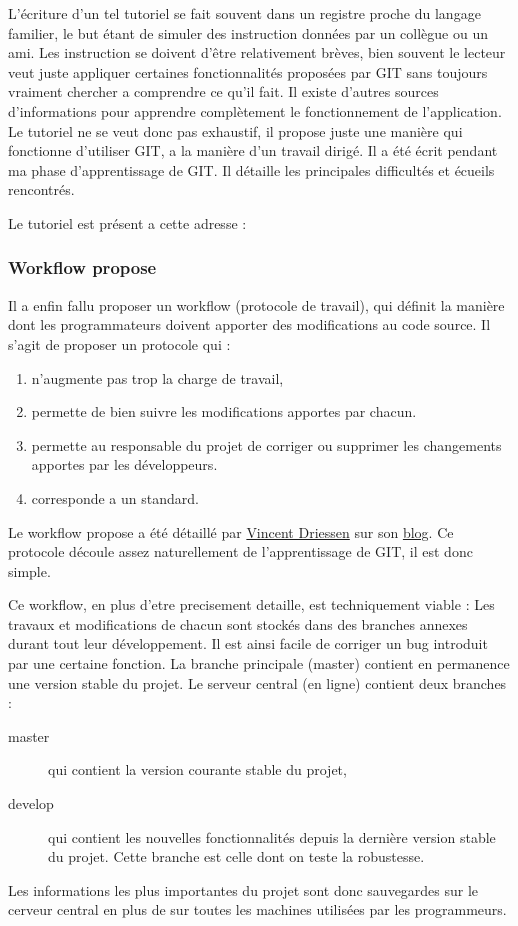 L'écriture d'un tel tutoriel se fait souvent dans un registre proche du langage familier, le but étant de simuler des instruction données par un collègue ou un ami. Les instruction se doivent d'être relativement brèves, bien souvent le lecteur veut juste appliquer certaines fonctionnalités proposées par GIT sans toujours vraiment chercher a comprendre ce qu'il fait. Il existe d'autres sources d'informations pour apprendre complètement le fonctionnement de l'application.
Le tutoriel ne se veut donc pas exhaustif, il propose juste une manière qui fonctionne d'utiliser GIT, a la manière d'un travail dirigé. Il a été écrit pendant ma phase d'apprentissage de GIT. Il détaille les principales difficultés et écueils rencontrés. 

Le tutoriel est présent a cette adresse : \\
\url{}

\subsubsection{Workflow propose}
Il a enfin fallu proposer un workflow (protocole de travail), qui définit la manière dont les programmateurs doivent apporter des modifications au code source. Il s'agit de proposer un protocole qui :
\begin{enumerate}
  \item n'augmente pas trop la charge de travail,
  \item permette de bien suivre les modifications apportes par chacun. 
  \item permette au responsable du projet de corriger ou supprimer les changements apportes par les développeurs.
  \item corresponde a un standard.
\end{enumerate}
Le workflow propose a été détaillé par \href{http://nvie.com/about }{Vincent Driessen} sur son \href{http://nvie.com/git-model}{blog}. Ce protocole découle assez naturellement de l'apprentissage de GIT, il est donc simple.

Ce workflow, en plus d'etre precisement detaille, est techniquement viable :
Les travaux et modifications de chacun sont stockés dans des branches annexes durant tout leur développement. Il est ainsi facile de corriger un bug introduit par une certaine fonction. La branche principale (master) contient en permanence une version stable du projet.
Le serveur central (en ligne) contient deux branches :
\begin{description}
  \item [master] qui contient la version courante stable du projet,
  \item [develop] qui contient les nouvelles fonctionnalités depuis la dernière version stable du projet. Cette branche est celle dont on teste la robustesse.
\end{description}
Les informations les plus importantes du projet sont donc sauvegardes sur le cerveur central en plus de sur toutes les machines utilisées par les programmeurs. 


